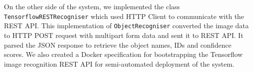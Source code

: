 


On the other side of the system, we implemented the class \texttt{TensorflowRESTRecogniser} which used HTTP Client to communicate with the REST API. This implementation of \texttt{ObjectRecogniser} converted the image data to HTTP POST request with multipart form data and sent it to REST API. It parsed the JSON response to retrieve the object names, IDs and confidence scores. We also created a Docker specification for bootstrapping the Tensorflow image recognition REST API for semi-automated deployment of the system.

